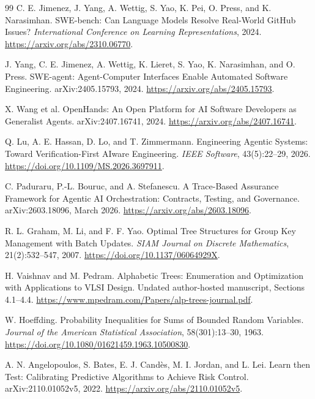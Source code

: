\begin{thebibliography}{99}
\sloppy
{} C. E. Jimenez, J. Yang, A. Wettig, S. Yao, K. Pei, O. Press, and K. Narasimhan. SWE-bench: Can Language Models Resolve Real-World GitHub Issues? \emph{International Conference on Learning Representations}, 2024. \url{https://arxiv.org/abs/2310.06770}.

 J. Yang, C. E. Jimenez, A. Wettig, K. Lieret, S. Yao, K. Narasimhan, and O. Press. SWE-agent: Agent-Computer Interfaces Enable Automated Software Engineering. arXiv:2405.15793, 2024. \url{https://arxiv.org/abs/2405.15793}.

 X. Wang et al. OpenHands: An Open Platform for AI Software Developers as Generalist Agents. arXiv:2407.16741, 2024. \url{https://arxiv.org/abs/2407.16741}.

 Q. Lu, A. E. Hassan, D. Lo, and T. Zimmermann. Engineering Agentic Systems: Toward Verification-First AIware Engineering. \emph{IEEE Software}, 43(5):22--29, 2026. \url{https://doi.org/10.1109/MS.2026.3697911}.

 C. Paduraru, P.-L. Bouruc, and A. Stefanescu. A Trace-Based Assurance Framework for Agentic AI Orchestration: Contracts, Testing, and Governance. arXiv:2603.18096, March 2026. \url{https://arxiv.org/abs/2603.18096}.

 R. L. Graham, M. Li, and F. F. Yao. Optimal Tree Structures for Group Key Management with Batch Updates. \emph{SIAM Journal on Discrete Mathematics}, 21(2):532--547, 2007. \url{https://doi.org/10.1137/06064929X}.

 H. Vaishnav and M. Pedram. Alphabetic Trees: Enumeration and Optimization with Applications to VLSI Design. Undated author-hosted manuscript, Sections 4.1--4.4. \url{https://www.mpedram.com/Papers/alp-trees-journal.pdf}.

 W. Hoeffding. Probability Inequalities for Sums of Bounded Random Variables. \emph{Journal of the American Statistical Association}, 58(301):13--30, 1963. \url{https://doi.org/10.1080/01621459.1963.10500830}.

 A. N. Angelopoulos, S. Bates, E. J. Cand\`es, M. I. Jordan, and L. Lei. Learn then Test: Calibrating Predictive Algorithms to Achieve Risk Control. arXiv:2110.01052v5, 2022. \url{https://arxiv.org/abs/2110.01052v5}.


\end{thebibliography}
